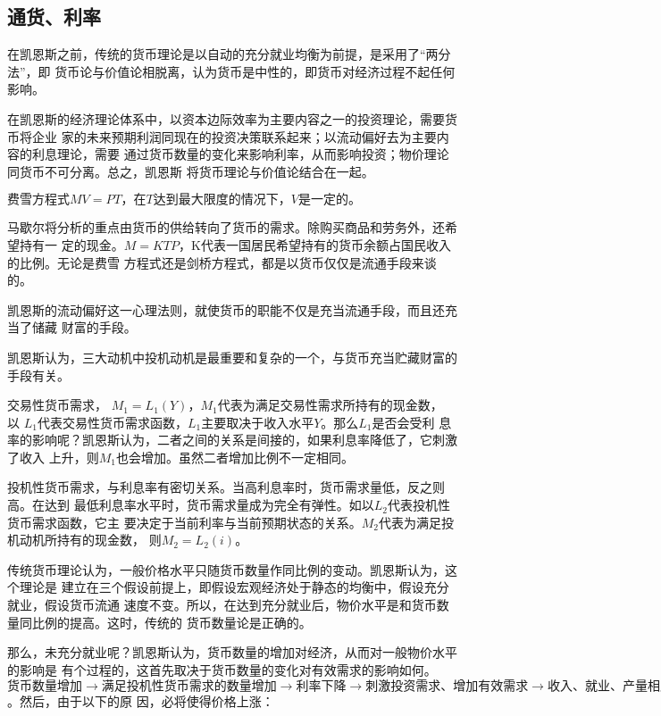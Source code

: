 \subsection{通货、利率}

在凯恩斯之前，传统的货币理论是以自动的充分就业均衡为前提，是采用了“两分法”，即
货币论与价值论相脱离，认为货币是中性的，即货币对经济过程不起任何影响。

在凯恩斯的经济理论体系中，以资本边际效率为主要内容之一的投资理论，需要货币将企业
家的未来预期利润同现在的投资决策联系起来；以流动偏好去为主要内容的利息理论，需要
通过货币数量的变化来影响利率，从而影响投资；物价理论同货币不可分离。总之，凯恩斯
将货币理论与价值论结合在一起。

$费雪方程式 MV=PT，在T达到最大限度的情况下，V是一定的。$

马歇尔将分析的重点由货币的供给转向了货币的需求。除购买商品和劳务外，还希望持有一
定的现金。$M = KTP$，K代表一国居民希望持有的货币余额占国民收入的比例。无论是费雪
方程式还是剑桥方程式，都是以货币仅仅是流通手段来谈的。

凯恩斯的流动偏好这一心理法则，就使货币的职能不仅是充当流通手段，而且还充当了储藏
财富的手段。

凯恩斯认为，三大动机中投机动机是最重要和复杂的一个，与货币充当贮藏财富的手段有关。

交易性货币需求， $ M_1 = L_1(Y)$，$M_1$代表为满足交易性需求所持有的现金数，
以 $L_1$代表交易性货币需求函数，$L_1$主要取决于收入水平$Y$。那么$L_1$是否会受利
息率的影响呢？凯恩斯认为，二者之间的关系是间接的，如果利息率降低了，它刺激了收入
上升，则$M_1$也会增加。虽然二者增加比例不一定相同。

投机性货币需求，与利息率有密切关系。当高利息率时，货币需求量低，反之则高。在达到
最低利息率水平时，货币需求量成为完全有弹性。如以$L_2$代表投机性货币需求函数，它主
要决定于当前利率与当前预期状态的关系。$M_2$代表为满足投机动机所持有的现金数，
则$M_2 = L_2(i)$。

传统货币理论认为，一般价格水平只随货币数量作同比例的变动。凯恩斯认为，这个理论是
建立在三个假设前提上，即假设宏观经济处于静态的均衡中，假设充分就业，假设货币流通
速度不变。所以，在达到充分就业后，物价水平是和货币数量同比例的提高。这时，传统的
货币数量论是正确的。

那么，未充分就业呢？凯恩斯认为，货币数量的增加对经济，从而对一般物价水平的影响是
有个过程的，这首先取决于货币数量的变化对有效需求的影响如何。$货币数量增加
\rightarrow 满足投机性货币需求的数量增加 \rightarrow 利率下降 \rightarrow 刺激投
资需求、增加有效需求 \rightarrow 收入、就业、产量相应增加 $。然后，由于以下的原
因，必将使得价格上涨：

